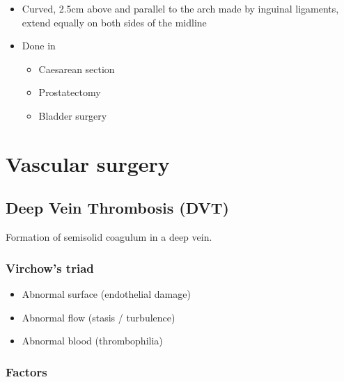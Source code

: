 \documentclass[
  12pt,
]{memoir}
\providecommand{\tightlist}{%
  \setlength{\itemsep}{0pt}\setlength{\parskip}{0pt}}
\begin{document}
\begin{itemize}
\tightlist
\item
  Curved, 2.5cm above and parallel to the arch made by inguinal
  ligaments, extend equally on both sides of the midline
\item
  Done in

  \begin{itemize}
  \tightlist
  \item
    Caesarean section
  \item
    Prostatectomy
  \item
    Bladder surgery
  \end{itemize}
\end{itemize}

\pagebreak

\hypertarget{vascular-surgery}{%
\chapter{Vascular surgery}\label{vascular-surgery}}

\hypertarget{deep-vein-thrombosis-dvt}{%
\section{Deep Vein Thrombosis (DVT)}\label{deep-vein-thrombosis-dvt}}

Formation of semisolid coagulum in a deep vein.

\hypertarget{virchows-triad}{%
\subsection{Virchow's triad}\label{virchows-triad}}

\begin{itemize}
\tightlist
\item
  Abnormal surface (endothelial damage)
\item
  Abnormal flow (stasis / turbulence)
\item
  Abnormal blood (thrombophilia)
\end{itemize}

\hypertarget{factors}{%
\subsection{Factors}\label{factors}}
\end{document}
